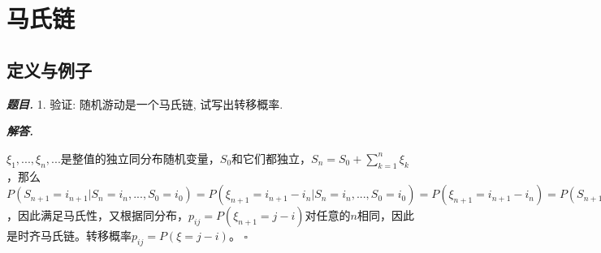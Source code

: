 \documentclass[10pt, a4paper, oneside]{ctexart}
\newenvironment{problem}{\begin{framed}\par\noindent\textbf{\textit{题目. }}}{\end{framed}\par}
\newenvironment{solution}{%
  \par\noindent\textbf{\textit{解答. }}\ignorespaces
}{%
  \hfill\ensuremath{\square}\par %
}
\begin{document}
\section{马氏链}
\subsection{定义与例子}
\begin{problem}
1. 验证: 随机游动是一个马氏链, 试写出转移概率.
\end{problem}
\begin{solution}
$\xi_1,...,\xi_n,...$是整值的独立同分布随机变量，$S_0$和它们都独立，$S_n=S_0+\sum_{k=1}^n \xi_k$，那么$P(S_{n+1}=i_{n+1}|S_n=i_n,...,S_0=i_0)=P(\xi_{n+1}=i_{n+1}-i_{n}|S_n=i_n,...,S_0=i_0)=P(\xi_{n+1}=i_{n+1}-i_{n})=P(S_{n+1}=i_{n+1}|S_{n}=i_{n})$，因此满足马氏性，又根据同分布，$p_{ij}=P(\xi_{n+1}=j-i)$对任意的$n$相同，因此是时齐马氏链。转移概率$p_{ij}=P(\xi=j-i)$。
\end{solution}
\end{document}
